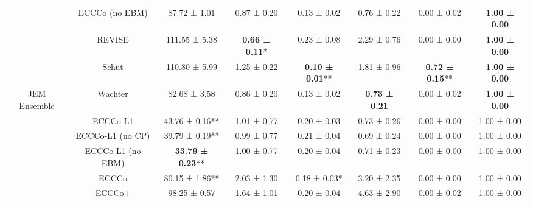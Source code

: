 \begin{table}
{\begin{tabular}[t]{cccccccc}
 & ECCCo (no EBM) & 87.72 ± 1.01\hphantom{*}\hphantom{*} & 0.87 ± 0.20\hphantom{*}\hphantom{*} & 0.13 ± 0.02\hphantom{*}\hphantom{*} & 0.76 ± 0.22\hphantom{*}\hphantom{*} & 0.00 ± 0.02\hphantom{*}\hphantom{*} & \textbf{1.00 ± 0.00}\hphantom{*}\hphantom{*}\\

 & REVISE & 111.55 ± 5.38\hphantom{*}\hphantom{*} & \textbf{0.66 ± 0.11}*\hphantom{*} & 0.23 ± 0.08\hphantom{*}\hphantom{*} & 2.29 ± 0.76\hphantom{*}\hphantom{*} & 0.00 ± 0.00\hphantom{*}\hphantom{*} & \textbf{1.00 ± 0.00}\hphantom{*}\hphantom{*}\\

 & Schut & 110.80 ± 5.99\hphantom{*}\hphantom{*} & 1.25 ± 0.22\hphantom{*}\hphantom{*} & \textbf{0.10 ± 0.01}** & 1.81 ± 0.96\hphantom{*}\hphantom{*} & \textbf{0.72 ± 0.15}** & \textbf{1.00 ± 0.00}\hphantom{*}\hphantom{*}\\

\multirow[t]{-10}{*}{\centering\arraybackslash JEM Ensemble} & Wachter & 82.68 ± 3.58\hphantom{*}\hphantom{*} & 0.86 ± 0.20\hphantom{*}\hphantom{*} & 0.13 ± 0.02\hphantom{*}\hphantom{*} & \textbf{0.73 ± 0.21}\hphantom{*}\hphantom{*} & 0.00 ± 0.02\hphantom{*}\hphantom{*} & \textbf{1.00 ± 0.00}\hphantom{*}\hphantom{*}\\
\cmidrule{1-8}
 & ECCCo-L1 & 43.76 ± 0.16** & 1.01 ± 0.77\hphantom{*}\hphantom{*} & 0.20 ± 0.03\hphantom{*}\hphantom{*} & 0.73 ± 0.26\hphantom{*}\hphantom{*} & 0.00 ± 0.00\hphantom{*}\hphantom{*} & 1.00 ± 0.00\hphantom{*}\hphantom{*}\\

 & ECCCo-L1 (no CP) & 39.79 ± 0.19** & 0.99 ± 0.77\hphantom{*}\hphantom{*} & 0.21 ± 0.04\hphantom{*}\hphantom{*} & 0.69 ± 0.24\hphantom{*}\hphantom{*} & 0.00 ± 0.00\hphantom{*}\hphantom{*} & 1.00 ± 0.00\hphantom{*}\hphantom{*}\\

 & ECCCo-L1 (no EBM) & \textbf{33.79 ± 0.23}** & 1.00 ± 0.77\hphantom{*}\hphantom{*} & 0.20 ± 0.04\hphantom{*}\hphantom{*} & 0.71 ± 0.23\hphantom{*}\hphantom{*} & 0.00 ± 0.00\hphantom{*}\hphantom{*} & 1.00 ± 0.00\hphantom{*}\hphantom{*}\\

 & ECCCo & 80.15 ± 1.86** & 2.03 ± 1.30\hphantom{*}\hphantom{*} & 0.18 ± 0.03*\hphantom{*} & 3.20 ± 2.35\hphantom{*}\hphantom{*} & 0.00 ± 0.00\hphantom{*}\hphantom{*} & 1.00 ± 0.00\hphantom{*}\hphantom{*}\\

 & ECCCo+ & 98.25 ± 0.57\hphantom{*}\hphantom{*} & 1.64 ± 1.01\hphantom{*}\hphantom{*} & 0.20 ± 0.04\hphantom{*}\hphantom{*} & 4.63 ± 2.90\hphantom{*}\hphantom{*} & 0.00 ± 0.02\hphantom{*}\hphantom{*} & 1.00 ± 0.00\hphantom{*}\hphantom{*}\\


\end{tabular}}
\end{table}
